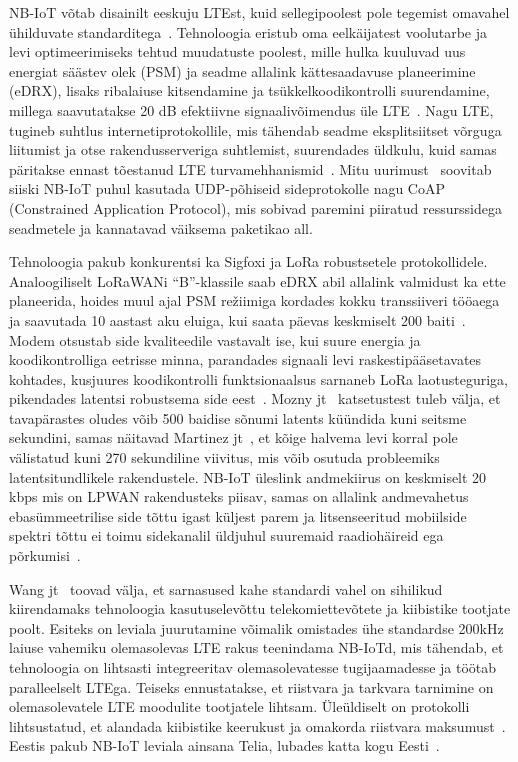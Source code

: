 \documentclass[12pt]{article}
\begin{document}
    NB-IoT võtab disainilt eeskuju LTEst, kuid sellegipoolest pole tegemist omavahel ühilduvate standarditega~\cite{wanglin}.
    Tehnoloogia eristub oma eelkäijatest voolutarbe ja levi optimeerimiseks tehtud muudatuste poolest, mille hulka kuuluvad uus energiat säästev olek (PSM) ja seadme allalink kättesaadavuse planeerimine (eDRX), lisaks ribalaiuse kitsendamine ja tsükkelkoodikontrolli suurendamine, millega saavutatakse 20 dB efektiivne signaalivõimendus üle LTE~\cite{xuyao}.
    Nagu LTE, tugineb suhtlus internetiprotokollile, mis tähendab seadme eksplitsiitset võrguga liitumist ja otse rakendusserveriga suhtlemist, suurendades üldkulu, kuid samas päritakse ennast tõestanud LTE turvamehhanismid~\cite{basu}.
    Mitu uurimust~\cite{wirges, larmo} soovitab siiski NB-IoT puhul kasutada UDP-põhiseid sideprotokolle nagu CoAP (Constrained Application Protocol), mis sobivad paremini piiratud ressurssidega seadmetele ja kannatavad väiksema paketikao all.

    Tehnoloogia pakub konkurentsi ka Sigfoxi ja LoRa robustsetele protokollidele.
    Analoogiliselt LoRaWANi “B”-klassile saab eDRX abil allalink valmidust ka ette planeerida, hoides muul ajal PSM režiimiga kordades kokku transsiiveri tööaega ja saavutada 10 aastast aku eluiga, kui saata päevas keskmiselt 200 baiti~\cite{wanglin}.
    Modem otsustab side kvaliteedile vastavalt ise, kui suure energia ja koodikontrolliga eetrisse minna, parandades signaali levi raskestipääsetavates kohtades, kusjuures koodikontrolli funktsionaalsus sarnaneb LoRa laotusteguriga, pikendades latentsi robustsema side eest~\cite{martinez}.
    Mozny jt~\cite{mozny} katsetustest tuleb välja, et tavapärastes oludes võib 500 baidise sõnumi latents küündida kuni seitsme sekundini, samas näitavad Martinez jt~\cite{martinez}, et kõige halvema levi korral pole välistatud kuni 270 sekundiline viivitus, mis võib osutuda probleemiks latentsitundlikele rakendustele.
    NB-IoT üleslink andmekiirus on keskmiselt 20 kbps mis on LPWAN rakendusteks piisav, samas on allalink andmevahetus ebasümmeetrilise side tõttu igast küljest parem ja litsenseeritud mobiilside spektri tõttu ei toimu sidekanalil üldjuhul suuremaid raadiohäireid ega põrkumisi~\cite{wanglin}.

    Wang jt~\cite{wanglin} toovad välja, et sarnasused kahe standardi vahel on sihilikud kiirendamaks tehnoloogia kasutuselevõttu telekomiettevõtete ja kiibistike tootjate poolt.
    Esiteks on leviala juurutamine võimalik omistades ühe standardse 200kHz laiuse vahemiku olemasolevas LTE rakus teenindama NB-IoTd, mis tähendab, et tehnoloogia on lihtsasti integreeritav olemasolevatesse tugijaamadesse ja töötab paralleelselt LTEga.
    Teiseks ennustatakse, et riistvara ja tarkvara tarnimine on olemasolevatele LTE moodulite tootjatele lihtsam.
    Üleüldiselt on protokolli lihtsustatud, et alandada kiibistike keerukust ja omakorda riistvara maksumust~\cite{xuyao}.
    Eestis pakub NB-IoT leviala ainsana Telia, lubades katta kogu Eesti~\cite{nbtelia}.
\end{document}
